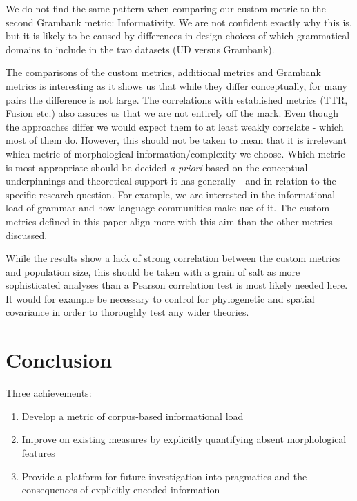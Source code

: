 \documentclass[USenglish]{article}
\begin{document}
We do not find the same pattern when comparing our custom metric to the second Grambank metric: Informativity. 
We are not confident exactly why this is, but it is likely to be caused by differences in design choices of which grammatical domains to include in the two datasets (UD versus Grambank).

The comparisons of the custom metrics, additional metrics and Grambank metrics is interesting as it shows us that while they differ conceptually, for many pairs the difference is not large. 
The correlations with established metrics (TTR, Fusion etc.) also assures us that we are not entirely off the mark. 
Even though the approaches differ we would expect them to at least weakly correlate - which most of them do. 
However, this should not be taken to mean that it is irrelevant which metric of morphological information/complexity we choose. %
Which metric is most appropriate should be decided \textit{a priori} based on the conceptual underpinnings and theoretical support it has generally - and in relation to the specific research question.
For example, we are interested in the informational load of grammar and how language communities make use of it. 
The custom metrics defined in this paper align more with this aim than the other metrics discussed. 

While the results show a lack of strong correlation between the custom metrics and population size, this should be taken with a grain of salt as more sophisticated analyses than a Pearson correlation test is most likely needed here. 
It would for example be necessary to control for phylogenetic and spatial covariance \citep{shcherbakova2023societies} in order to thoroughly test any wider theories.

\section{Conclusion}
Three achievements:
\begin{enumerate}
    \item Develop a metric of corpus-based informational load
    \item Improve on existing measures by explicitly quantifying absent morphological features
    \item Provide a platform for future investigation into pragmatics and the consequences of explicitly encoded information
\end{enumerate}
\end{document}
